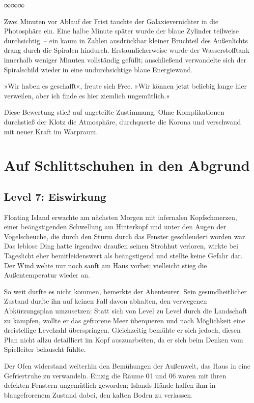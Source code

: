 \begin{center}
∞∞∞
\end{center}

Zwei Minuten vor Ablauf der Frist tauchte der Galaxievernichter in die Photosphäre ein. Eine halbe Minute später wurde der blaue Zylinder teilweise durchsichtig~– ein kaum in Zahlen ausdrückbar kleiner Bruchteil des Außenlichts drang durch die Spiralen hindurch. Erstaunlicherweise wurde der Wasserstofftank innerhalb weniger Minuten vollständig gefüllt; anschließend verwandelte sich der Spiralschild wieder in eine undurchsichtige blaue Energiewand.

»Wir haben es geschafft«, freute sich Free. »Wir können jetzt beliebig lange hier verweilen, aber ich finde es hier ziemlich ungemütlich.«

Diese Bewertung stieß auf ungeteilte Zustimmung. Ohne Komplikationen durchstieß der Klotz die Atmosphäre, durchquerte die Korona und verschwand mit neuer Kraft im Warpraum.


\chapter{Auf Schlittschuhen in den Abgrund}

\section{Level 7: Eiswirkung}

Floating Island erwachte am nächsten Morgen mit infernalen Kopfschmerzen, einer beängstigenden Schwellung am Hinterkopf und unter den Augen der Vogelscheuche, die durch den Sturm durch das Fenster geschleudert worden war. Das leblose Ding hatte irgendwo draußen seinen Strohhut verloren, wirkte bei Tageslicht eher bemitleidenswert als beängstigend und stellte keine Gefahr dar. Der Wind wehte nur noch sanft am Haus vorbei; vielleicht stieg die Außentemperatur wieder an.

So weit durfte es nicht kommen, bemerkte der Abenteurer. Sein gesundheitlicher Zustand durfte ihn auf keinen Fall davon abhalten, den verwegenen Abkürzungsplan umzusetzen: Statt sich von Level zu Level durch die Landschaft zu kämpfen, wollte er das gefrorene Meer überqueren und nach Möglichkeit eine dreistellige Levelzahl überspringen. Gleichzeitig bemühte er sich jedoch, diesen Plan nicht allzu detailliert im Kopf auszuarbeiten, da er sich beim Denken vom Spielleiter belauscht fühlte.

Der Ofen widerstand weiterhin den Bemühungen der Außenwelt, das Haus in eine Gefriertruhe zu verwandeln. Einzig die Räume 01 und 06 waren mit ihren defekten Fenstern ungemütlich geworden; Islands Hände halfen ihm in blaugefrorenem Zustand dabei, den kalten Boden zu verlassen.

